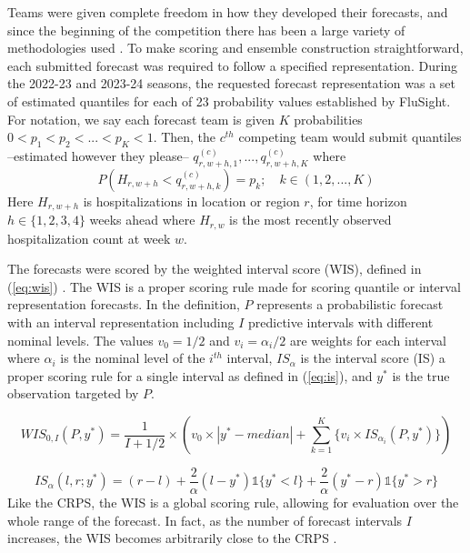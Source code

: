 Teams were given complete freedom in how they developed their forecasts, 
and since the beginning of the competition there has been a large variety of 
methodologies used 
\cite[]{mathis2024evaluation,mathis2023flusight,mcandrew2021adaptively,
osthus2021multiscale,osthus2019dynamic,ulloa2019,morgan2018wisdom,
farrow2017human}. To make scoring and ensemble construction straightforward, 
each submitted forecast was required to follow a specified representation. 
During the 2022-23 and 2023-24 seasons, the requested forecast representation 
was a set of estimated quantiles for each of 23 probability values established 
by FluSight. For notation, we say each forecast team is given $K$ 
probabilities $0 < p_1 < p_2 < ... < p_K < 1$. Then, the $c^{th}$ 
competing team would submit quantiles --estimated however they please-- 
$q^{(c)}_{r,w+h,1}, ..., q^{(c)}_{r,w+h,K}$ where 
\[
    P(H_{r,w+h} < q^{(c)}_{r,w+h, k}) = p_k; \quad k \in (1, 2, ..., K)
\]
Here $H_{r,w+h}$ is hospitalizations in location or region $r$, 
for time horizon 
$h \in \{1,2,3,4\}$ weeks ahead where $H_{r,w}$ is the most recently 
observed hospitalization count at week $w$. 

The forecasts were scored by the weighted interval score (WIS), defined in 
(\ref{eq:wis}) \cite[]{bracher2021evaluating}. The WIS is a proper scoring 
rule made for scoring quantile or interval representation forecasts. In the 
definition, $P$ represents a probabilistic forecast with an interval 
representation including $I$ predictive intervals with different nominal 
levels. The values $v_0 = 1/2$ and $v_i = \alpha_i / 2$ are weights for 
each interval where $\alpha_i$ is the nominal level of the $i^{th}$ interval, 
$IS_{\alpha}$ is the interval score (IS) a proper scoring rule for a single 
interval as defined in (\ref{eq:is}), and $y^*$ is the true observation 
targeted by $P$.

\begin{equation}
\label{eq:wis}
        WIS_{0,I}(P, y^*) = \frac{1}{I + 1/2} \times 
        (v_0\times |y^* - median| + \sum_{k=1}^K \{v_i 
        \times IS_{\alpha_i}(P, y^*) \} )
\end{equation}

\begin{equation}
\label{eq:is}
        IS_{\alpha}(l,r;y^*) = (r-l) + 
        \frac{2}{\alpha}(l - y^*)\mathds{1}\{y^* < l\} + 
        \frac{2}{\alpha}(y^* - r) \mathds{1}\{y^* > r\}
\end{equation}
Like the CRPS, the WIS is a global scoring rule, allowing for evaluation over 
the whole range of the forecast. In fact, as the number of forecast intervals 
$I$ increases, the WIS becomes arbitrarily close to the CRPS 
\cite[]{bracher2021evaluating,gneiting2011comparing}. 

